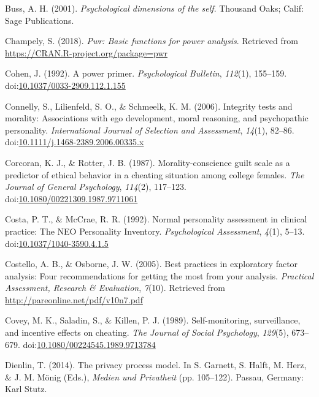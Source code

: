 \documentclass[man,floatsintext]{apa6}
\begin{document}
\leavevmode\hypertarget{ref-Buss.2001}{}%
Buss, A. H. (2001). \emph{Psychological dimensions of the self}. Thousand Oaks; Calif: Sage Publications.

\leavevmode\hypertarget{ref-R-pwr}{}%
Champely, S. (2018). \emph{Pwr: Basic functions for power analysis}. Retrieved from \url{https://CRAN.R-project.org/package=pwr}

\leavevmode\hypertarget{ref-Cohen.1992}{}%
Cohen, J. (1992). A power primer. \emph{Psychological Bulletin}, \emph{112}(1), 155--159. doi:\href{https://doi.org/10.1037/0033-2909.112.1.155}{10.1037/0033-2909.112.1.155}

\leavevmode\hypertarget{ref-Connelly.2006}{}%
Connelly, S., Lilienfeld, S. O., \& Schmeelk, K. M. (2006). Integrity tests and morality: Associations with ego development, moral reasoning, and psychopathic personality. \emph{International Journal of Selection and Assessment}, \emph{14}(1), 82--86. doi:\href{https://doi.org/10.1111/j.1468-2389.2006.00335.x}{10.1111/j.1468-2389.2006.00335.x}

\leavevmode\hypertarget{ref-Corcoran.1987}{}%
Corcoran, K. J., \& Rotter, J. B. (1987). Morality-conscience guilt scale as a predictor of ethical behavior in a cheating situation among college females. \emph{The Journal of General Psychology}, \emph{114}(2), 117--123. doi:\href{https://doi.org/10.1080/00221309.1987.9711061}{10.1080/00221309.1987.9711061}

\leavevmode\hypertarget{ref-Costa.1992b}{}%
Costa, P. T., \& McCrae, R. R. (1992). Normal personality assessment in clinical practice: The NEO Personality Inventory. \emph{Psychological Assessment}, \emph{4}(1), 5--13. doi:\href{https://doi.org/10.1037/1040-3590.4.1.5}{10.1037/1040-3590.4.1.5}

\leavevmode\hypertarget{ref-Osborne.2004b}{}%
Costello, A. B., \& Osborne, J. W. (2005). Best practices in exploratory factor analysis: Four recommendations for getting the most from your analysis. \emph{Practical Assessment, Research \& Evaluation}, \emph{7}(10). Retrieved from \url{http://pareonline.net/pdf/v10n7.pdf}

\leavevmode\hypertarget{ref-Covey.1989}{}%
Covey, M. K., Saladin, S., \& Killen, P. J. (1989). Self-monitoring, surveillance, and incentive effects on cheating. \emph{The Journal of Social Psychology}, \emph{129}(5), 673--679. doi:\href{https://doi.org/10.1080/00224545.1989.9713784}{10.1080/00224545.1989.9713784}

\leavevmode\hypertarget{ref-Dienlin.2014}{}%
Dienlin, T. (2014). The privacy process model. In S. Garnett, S. Halft, M. Herz, \& J. M. Mönig (Eds.), \emph{Medien und Privatheit} (pp. 105--122). Passau, Germany: Karl Stutz.
\end{document}
